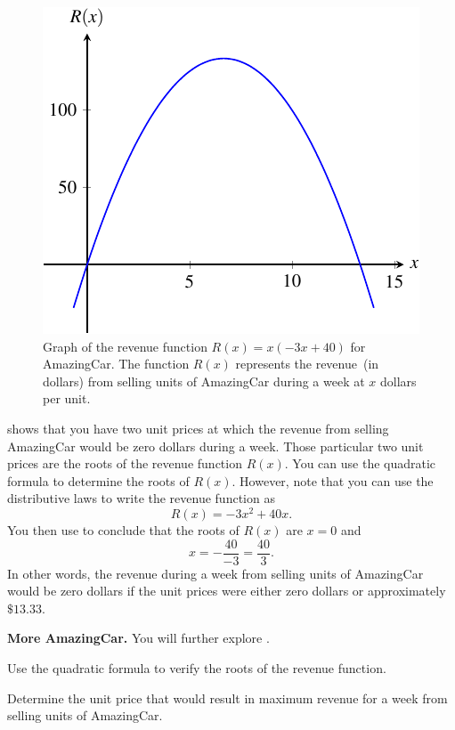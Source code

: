 \documentclass[a4paper,oneside,12pt]{article}
\begin{document}
\begin{solution}
\begin{figure}[!htbp]
\centering
\includegraphics[scale=1.1]{image/10/amazingcar-revenue.pdf}
\caption{%
  Graph of the revenue function $R(x) = x(-3x + 40)$ for AmazingCar.
  The function $R(x)$ represents the revenue~(in dollars) from selling
  units of AmazingCar during a week at $x$ dollars per unit.
}
\label{fig:quadroots:AmazingCar_revenue}
\end{figure}

 shows that you have two unit
prices at which the revenue from selling AmazingCar would be zero
dollars during a week.  Those particular two unit prices are the roots
of the revenue function $R(x)$.  You can use the quadratic formula to
determine the roots of $R(x)$.  However, note that you can use the
distributive laws to write the revenue function as
\begin{equation}
\label{eqn:quadroots:AmazingCar_revenue_function_distributive}
R(x)
=
-3x^2 + 40x.
\end{equation}
You then use
 to
conclude that the roots of $R(x)$ are $x = 0$ and
\[
x
=
-\frac{40}{-3}
=
\frac{40}{3}.
\]
In other words, the revenue during a week from selling units of
AmazingCar would be zero dollars if the unit prices were either zero
dollars or approximately $\$13.33$.
\end{solution}

\begin{exercise}
\textbf{More AmazingCar.}
You will further explore .
\begin{packedenum}
\item\label{subeg:quadroots:AmazingCar_roots_quadratic_formula}
  Use the quadratic formula to verify the roots of the revenue
  function.

\item\label{subeg:quadroots:AmazingCar_maximum_revenue}
  Determine the unit price that would result in maximum revenue for a
  week from selling units of AmazingCar.
\end{packedenum}
\end{exercise}
\end{document}
